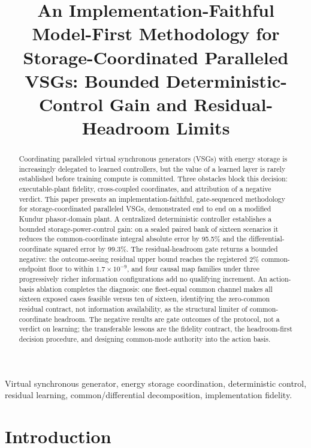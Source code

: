\documentclass[journal]{IEEEtran}
\title{An Implementation-Faithful Model-First Methodology for Storage-Coordinated Paralleled VSGs: Bounded Deterministic-Control Gain and Residual-Headroom Limits}
\author{\IEEEauthorblockN{Author names pending PI sign-off}%
\IEEEauthorblockA{Author affiliations pending PI sign-off}}
\begin{document}
\maketitle

\begin{abstract}
Coordinating paralleled virtual synchronous generators (VSGs) with energy storage is increasingly delegated to learned controllers, but the value of a learned layer is rarely established before training compute is committed. Three obstacles block this decision: executable-plant fidelity, cross-coupled coordinates, and attribution of a negative verdict. This paper presents an implementation-faithful, gate-sequenced methodology for storage-coordinated paralleled VSGs, demonstrated end to end on a modified Kundur phasor-domain plant. A centralized deterministic controller establishes a bounded storage-power-control gain: on a sealed paired bank of sixteen scenarios it reduces the common-coordinate integral absolute error by 95.5\% and the differential-coordinate squared error by 99.3\%. The residual-headroom gate returns a bounded negative: the outcome-seeing residual upper bound reaches the registered 2\% common-endpoint floor to within $1.7\times10^{-9}$, and four causal map families under three progressively richer information configurations add no qualifying increment. An action-basis ablation completes the diagnosis: one fleet-equal common channel makes all sixteen exposed cases feasible versus ten of sixteen, identifying the zero-common residual contract, not information availability, as the structural limiter of common-coordinate headroom. The negative results are gate outcomes of the protocol, not a verdict on learning; the transferable lessons are the fidelity contract, the headroom-first decision procedure, and designing common-mode authority into the action basis.
\end{abstract}

\begin{IEEEkeywords}
Virtual synchronous generator, energy storage coordination, deterministic control, residual learning, common/differential decomposition, implementation fidelity.
\end{IEEEkeywords}

\section{Introduction}
\label{sec:introduction}
\end{document}
